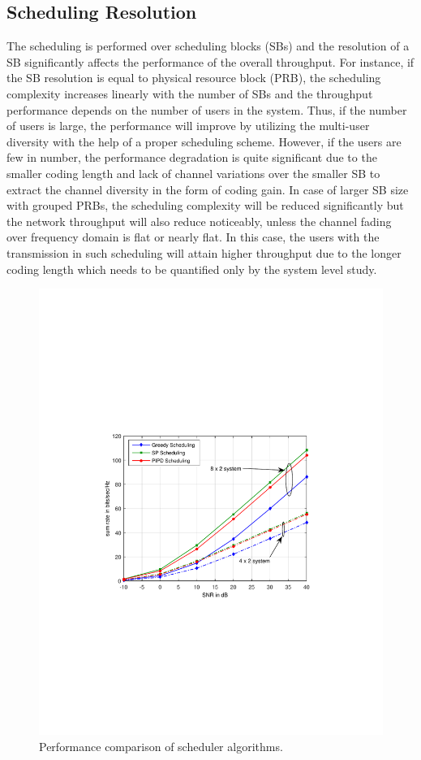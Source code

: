\documentclass[conference,letterpaper,10pt]{./../../IEEE/IEEEtran}
\begin{document}
\subsection{Scheduling Resolution}
The scheduling is performed over scheduling blocks (SBs) and the resolution of a SB significantly affects the performance of the overall throughput. For instance, if the SB resolution is equal to physical resource block (PRB), the scheduling complexity increases linearly with the number of SBs and the throughput performance depends on the number of users in the system. Thus, if the number of users is large, the performance will improve by utilizing the multi-user diversity with the help of a proper scheduling scheme. However, if the users are few in number, the performance degradation is quite significant due to the smaller coding length and lack of channel variations over the smaller SB to extract the channel diversity in the form of coding gain. In case of larger SB size with grouped PRBs, the scheduling complexity will be reduced significantly but the network throughput will also reduce noticeably, unless the channel fading over frequency domain is flat or nearly flat. In this case, the users with the transmission in such scheduling will attain higher throughput due to the longer coding length which needs to be quantified only by the system level study.
\begin{figure}
\centering
\includegraphics[trim=1.5in 3.5in 1.5in 3.5in,width=\columnwidth]{sra_50_users}
\caption{Performance comparison of scheduler algorithms.}
\label{kuva:performance_plot}
\end{figure}
\end{document}
